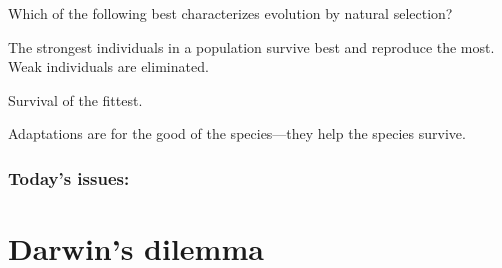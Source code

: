 \begin{noheadline}
\begin{frame}
    \begin{clickerquestion}
        \item Which of the following best characterizes evolution by natural
            selection?
        \begin{clickeroptions}
            \item The strongest individuals in a population survive best and
                reproduce the most. Weak individuals are eliminated. 
            \item Survival of the fittest.
            \item {}
            \item Adaptations are for the good of the species---they help the
                species survive.
        \end{clickeroptions}
    \end{clickerquestion}
\end{frame}
\end{noheadline}

\begin{noheadline}
\begin{frame}
\frametitle{Today's issues:}
\tableofcontents[subsectionstyle=hide]
\end{frame}
\end{noheadline}

\section{Darwin's dilemma}

